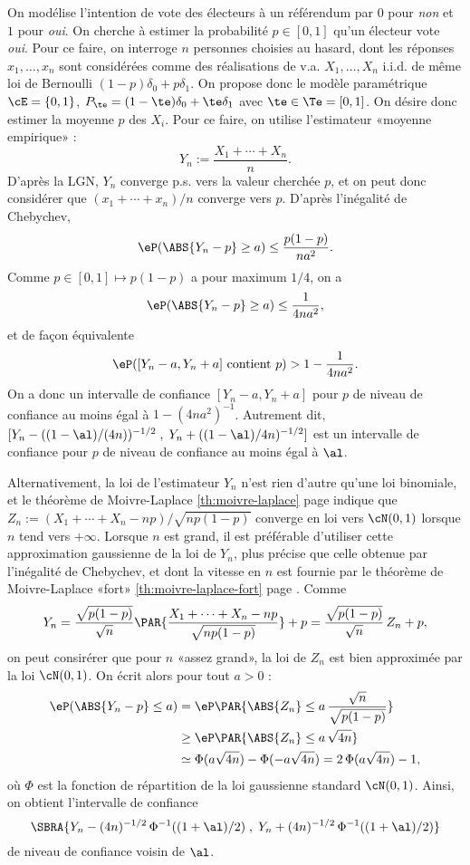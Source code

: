 On modélise l'intention de vote des électeurs à un référendum par $0$ pour
\emph{non} et $1$ pour \emph{oui}. On cherche à estimer la probabilité
$p\in[0,1]$ qu'un électeur vote \emph{oui}. Pour ce faire, on interroge $n$
personnes choisies au hasard, dont les réponses $x_1,\ldots,x_n$ sont
considérées comme des réalisations de v.a. $X_1,\ldots,X_n$ i.i.d. de même loi
de Bernoulli $(1-p)\delta_0+p\delta_1$. On propose donc le modèle paramétrique
$\cE=\{0,1\}$, $P_\te=(1-\te)\delta_0+\te\delta_1$ avec $\te\in\Te=[0,1]$. On désire
donc estimer la moyenne $p$ des $X_i$. Pour ce faire, on utilise l'estimateur
«moyenne empirique» :
$$
Y_n:=\frac{X_1+\cdots+X_n}{n}.
$$
D'après la LGN, $Y_n$ converge p.s. vers la valeur cherchée $p$, et on peut
donc considérer que $(x_1+\cdots+x_n)/n$ converge vers $p$.  D'après
l'inégalité de Chebychev,
$$
\eP(\ABS{Y_n-p} \geq a) \leq \frac{p(1-p)}{na^2}.
$$
Comme $p\in[0,1]\mapsto p(1-p)$ a pour maximum
$1/4$, on a
$$
\eP(\ABS{Y_n-p} \geq a) \leq \frac{1}{4na^2},
$$
et de façon équivalente
$$
\eP([Y_n-a,Y_n+a] \text{ contient } p) > 1-\frac{1}{4na^2}.
$$
On a donc un intervalle de confiance $[Y_n-a,Y_n+a]$ pour $p$ de niveau de
confiance au moins égal à $1-(4na^2)^{-1}$. Autrement dit,
$[Y_n-((1-\al)/(4n))^{-1/2}\;,\;Y_n+((1-\al)/4n)^{-1/2}]$ est un intervalle de
confiance pour $p$ de niveau de confiance au moins égal à $\al$.

Alternativement, la loi de l'estimateur $Y_n$ n'est rien d'autre qu'une loi
binomiale, et le théorème de Moivre-Laplace \ref{th:moivre-laplace} page
\pageref{th:moivre-laplace} indique que
$Z_n:=(X_1+\cdots+X_n-np)/\sqrt{np(1-p)}$ converge en loi vers $\cN(0,1)$
lorsque $n$ tend vers $+\infty$. Lorsque $n$ est grand, il est préférable
d'utiliser cette approximation gaussienne de la loi de $Y_n$, plus précise que
celle obtenue par l'inégalité de Chebychev, et dont la vitesse en $n$ est
fournie par le théorème de Moivre-Laplace «fort» \ref{th:moivre-laplace-fort}
page \pageref{th:moivre-laplace-fort}. Comme
$$
Y_n=\frac{\sqrt{p(1-p)}}{\sqrt{n}}\PAR{\frac{X_1+\cdots+X_n-np}{\sqrt{np(1-p)}}}+p
=\frac{\sqrt{p(1-p)}}{\sqrt{n}}\,Z_n+p,
$$
on peut consirérer que pour $n$ «assez grand», la loi de $Z_n$ est bien
approximée par la loi $\cN(0,1)$. On écrit alors pour tout $a>0$ :
\begin{align*}
  \eP(\ABS{Y_n-p} \leq a) 
  &= \eP\PAR{\ABS{Z_n} \leq a\,\frac{\sqrt{n}}{\sqrt{p(1-p)}}}\\
  &\geq \eP\PAR{\ABS{Z_n} \leq a\,\sqrt{4n}} \\
  &\simeq \Phi(a\sqrt{4n})-\Phi(-a\sqrt{4n}) = 2\,\Phi(a\sqrt{4n})-1,
\end{align*}
où $\Phi$ est la fonction de répartition de la loi gaussienne standard
$\cN(0,1)$. Ainsi, on obtient l'intervalle de confiance
$$
\SBRA{Y_n-(4n)^{-1/2}\,\Phi^{-1}((1+\al)/2)\;,\;Y_n+(4n)^{-1/2}\,\Phi^{-1}((1+\al)/2)}
$$
de niveau de confiance voisin de $\al$.

